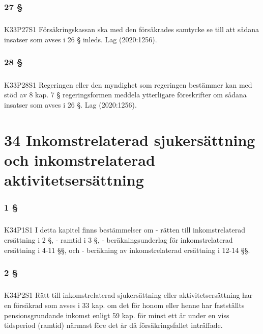 \documentclass[a4paper,notitlepage,openany,10pt]{book}
\begin{document}
\subsection*{27 §}
\paragraph*{}
{\tiny K33P27S1}
Försäkringskassan ska med den försäkrades samtycke se till att sådana insatser som avses i 26 § inleds.
Lag (2020:1256).
\subsection*{28 §}
\paragraph*{}
{\tiny K33P28S1}
Regeringen eller den myndighet som regeringen bestämmer kan med stöd av 8 kap. 7 § regeringsformen meddela ytterligare föreskrifter om sådana insatser som avses i 26 §.
Lag (2020:1256).
\chapter*{34 Inkomstrelaterad sjukersättning och inkomstrelaterad aktivitetsersättning}
\subsection*{1 §}
\paragraph*{}
{\tiny K34P1S1}
I detta kapitel finns bestämmelser om
\newline - rätten till inkomstrelaterad ersättning i 2 §,
\newline - ramtid i 3 §,
\newline - beräkningsunderlag för inkomstrelaterad ersättning i 4-11 §§, och
\newline - beräkning av inkomstrelaterad ersättning i 12-14 §§.
\subsection*{2 §}
\paragraph*{}
{\tiny K34P2S1}
Rätt till inkomstrelaterad sjukersättning eller aktivitetsersättning har en försäkrad som avses i 33 kap. om det för honom eller henne har fastställts pensionsgrundande inkomst enligt 59 kap. för minst ett år under en viss tidsperiod (ramtid) närmast före det år då försäkringsfallet inträffade.
\end{document}
